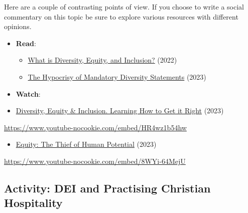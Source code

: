 \documentclass[
  letterpaper,
  DIV=11,
  numbers=noendperiod]{scrreprt}
\providecommand{\tightlist}{%
  \setlength{\itemsep}{0pt}\setlength{\parskip}{0pt}}\usepackage{longtable,booktabs,array}
\begin{document}
\begin{tcolorbox}[enhanced jigsaw, toprule=.15mm, colback=white, colframe=quarto-callout-note-color-frame, bottomtitle=1mm, leftrule=.75mm, coltitle=black, titlerule=0mm, rightrule=.15mm, colbacktitle=quarto-callout-note-color!10!white, left=2mm, title={Learning Activity}, opacitybacktitle=0.6, opacityback=0, breakable, toptitle=1mm, arc=.35mm, bottomrule=.15mm]

Here are a couple of contrasting points of view. If you choose to write
a social commentary on this topic be sure to explore various resources
with different opinions.

\begin{itemize}
\tightlist
\item
  \textbf{Read}:

  \begin{itemize}
  \tightlist
  \item
    \href{https://www.mckinsey.com/featured-insights/mckinsey-explainers/what-is-diversity-equity-and-inclusion}{What
    is Diversity, Equity, and Inclusion?} (2022)
  \item
    \href{https://www.theatlantic.com/ideas/archive/2023/07/hypocrisy-mandatory-diversity-statements/674611/}{The
    Hypocrisy of Mandatory Diversity Statements} (2023)
  \end{itemize}
\item
  \textbf{Watch}:
\item
  \href{https://www.youtube.com/watch?v=HR4wz1b54hw}{Diversity, Equity
  \& Inclusion. Learning How to Get it Right} (2023)
\end{itemize}

\url{https://www.youtube-nocookie.com/embed/HR4wz1b54hw}

\begin{itemize}
\tightlist
\item
  \href{https://www.youtube.com/watch?v=8WYi-64MejU}{Equity: The Thief
  of Human Potential} (2023)
\end{itemize}

\url{https://www.youtube-nocookie.com/embed/8WYi-64MejU}

\end{tcolorbox}

\subsection{Activity: DEI and Practising Christian
Hospitality}\label{activity-dei-and-practising-christian-hospitality}
\end{document}
